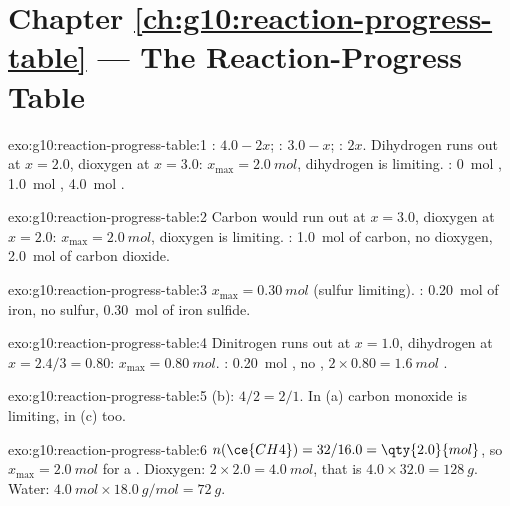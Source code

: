 \section*{Chapter \ref{ch:g10:reaction-progress-table} --- The Reaction-Progress Table}

\begin{solution}{exo:g10:reaction-progress-table:1}
: $4.0 - 2x$; : $3.0 - x$; : $2x$. Dihydrogen runs
out at $x = 2.0$, dioxygen at $x = 3.0$: $x_{\max} = \qty{2.0}{mol}$,
dihydrogen is limiting. : \qty{0}{mol} ,
\qty{1.0}{mol} , \qty{4.0}{mol} .
\end{solution}

\begin{solution}{exo:g10:reaction-progress-table:2}
Carbon would run out at $x = 3.0$, dioxygen at $x = 2.0$:
$x_{\max} = \qty{2.0}{mol}$, dioxygen is limiting. :
\qty{1.0}{mol} of carbon, no dioxygen, \qty{2.0}{mol} of carbon dioxide.
\end{solution}

\begin{solution}{exo:g10:reaction-progress-table:3}
$x_{\max} = \qty{0.30}{mol}$ (sulfur limiting). :
\qty{0.20}{mol} of iron, no sulfur, \qty{0.30}{mol} of iron sulfide.
\end{solution}

\begin{solution}{exo:g10:reaction-progress-table:4}
Dinitrogen runs out at $x = 1.0$, dihydrogen at $x = 2.4/3 = 0.80$:
$x_{\max} = \qty{0.80}{mol}$. : \qty{0.20}{mol} , no
, $2 \times 0.80 = \qty{1.6}{mol}$ .
\end{solution}

\begin{solution}{exo:g10:reaction-progress-table:5}
(b): $4/2 = 2/1$. In (a) carbon monoxide is limiting, in (c) too.
\end{solution}

\begin{solution}{exo:g10:reaction-progress-table:6}
$n(\ce{CH4}) = 32 / 16.0 = \qty{2.0}{mol}$, so $x_{\max} = \qty{2.0}{mol}$
for a . Dioxygen: $2 \times 2.0 = \qty{4.0}{mol}$,
that is $4.0 \times 32.0 = \qty{128}{g}$. Water:
$\qty{4.0}{mol} \times \qty{18.0}{g/mol} = \qty{72}{g}$.
\end{solution}

